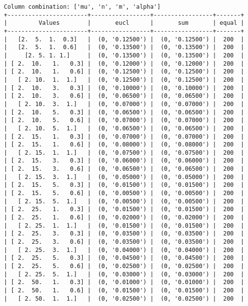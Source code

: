 \documentclass{article}
\begin{document}
\begin{verbatim}
Column combination: ['mu', 'n', 'm', 'alpha']
+-----------------------+-----------------+-----------------+-------+
|         Values        |       eucl      |       sum       | equal |
+-----------------------+-----------------+-----------------+-------+
|   [2.  5.  1.  0.3]   |  (0, '0.12500') |  (0, '0.12500') |  200  |
|   [2.  5.  1.  0.6]   |  (0, '0.13500') |  (0, '0.13500') |  200  |
|     [2. 5. 1. 1.]     |  (0, '0.13500') |  (0, '0.13500') |  200  |
| [ 2.  10.   1.   0.3] |  (0, '0.12000') |  (0, '0.12000') |  200  |
| [ 2.  10.   1.   0.6] |  (0, '0.12500') |  (0, '0.12500') |  200  |
|   [ 2. 10.  1.  1.]   |  (0, '0.12500') |  (0, '0.12500') |  200  |
| [ 2.  10.   3.   0.3] |  (0, '0.10000') |  (0, '0.10000') |  200  |
| [ 2.  10.   3.   0.6] |  (0, '0.06500') |  (0, '0.06500') |  200  |
|   [ 2. 10.  3.  1.]   |  (0, '0.07000') |  (0, '0.07000') |  200  |
| [ 2.  10.   5.   0.3] |  (0, '0.06500') |  (0, '0.06500') |  200  |
| [ 2.  10.   5.   0.6] |  (0, '0.07000') |  (0, '0.07000') |  200  |
|   [ 2. 10.  5.  1.]   |  (0, '0.06500') |  (0, '0.06500') |  200  |
| [ 2.  15.   1.   0.3] |  (0, '0.07000') |  (0, '0.07000') |  200  |
| [ 2.  15.   1.   0.6] |  (0, '0.08000') |  (0, '0.08000') |  200  |
|   [ 2. 15.  1.  1.]   |  (0, '0.07500') |  (0, '0.07500') |  200  |
| [ 2.  15.   3.   0.3] |  (0, '0.06000') |  (0, '0.06000') |  200  |
| [ 2.  15.   3.   0.6] |  (0, '0.06500') |  (0, '0.06500') |  200  |
|   [ 2. 15.  3.  1.]   |  (0, '0.05000') |  (0, '0.05000') |  200  |
| [ 2.  15.   5.   0.3] |  (0, '0.01500') |  (0, '0.01500') |  200  |
| [ 2.  15.   5.   0.6] |  (0, '0.00500') |  (0, '0.00500') |  200  |
|   [ 2. 15.  5.  1.]   |  (0, '0.00500') |  (0, '0.00500') |  200  |
| [ 2.  25.   1.   0.3] |  (0, '0.01500') |  (0, '0.01500') |  200  |
| [ 2.  25.   1.   0.6] |  (0, '0.02000') |  (0, '0.02000') |  200  |
|   [ 2. 25.  1.  1.]   |  (0, '0.01500') |  (0, '0.01500') |  200  |
| [ 2.  25.   3.   0.3] |  (0, '0.03500') |  (0, '0.03500') |  200  |
| [ 2.  25.   3.   0.6] |  (0, '0.03500') |  (0, '0.03500') |  200  |
|   [ 2. 25.  3.  1.]   |  (0, '0.04000') |  (0, '0.04000') |  200  |
| [ 2.  25.   5.   0.3] |  (0, '0.04500') |  (0, '0.04500') |  200  |
| [ 2.  25.   5.   0.6] |  (0, '0.02500') |  (0, '0.02500') |  200  |
|   [ 2. 25.  5.  1.]   |  (0, '0.03000') |  (0, '0.03000') |  200  |
| [ 2.  50.   1.   0.3] |  (0, '0.01000') |  (0, '0.01000') |  200  |
| [ 2.  50.   1.   0.6] |  (0, '0.01500') |  (0, '0.01500') |  200  |
|   [ 2. 50.  1.  1.]   |  (0, '0.02500') |  (0, '0.02500') |  200  |

\end{verbatim}
\end{document}
